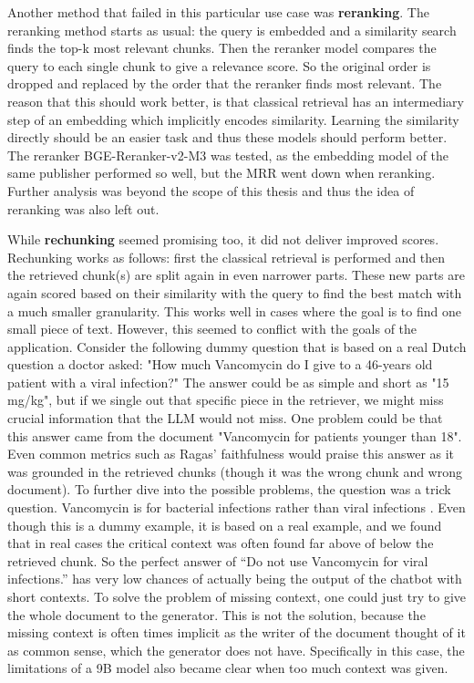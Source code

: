 Another method that failed in this particular use case was \textbf{reranking}. The reranking method starts as usual: the query is embedded and a similarity search finds the top-k most relevant chunks. Then the reranker model compares the query to each single chunk to give a relevance score. So the original order is dropped and replaced by the order that the reranker finds most relevant. The reason that this should work better, is that classical retrieval has an intermediary step of an embedding which implicitly encodes similarity. Learning the similarity directly should be an easier task and thus these models should perform better. The reranker BGE-Reranker-v2-M3 \cite{chen2024bge} was tested, as the embedding model of the same publisher performed so well, but the MRR went down when reranking. Further analysis was beyond the scope of this thesis and thus the idea of reranking was also left out.

While \textbf{rechunking} seemed promising too, it did not deliver improved scores. Rechunking works as follows: first the classical retrieval is performed and then the retrieved chunk(s) are split again in even narrower parts. These new parts are again scored based on their similarity with the query to find the best match with a much smaller granularity. This works well in cases where the goal is to find one small piece of text. However, this seemed to conflict with the goals of the application. Consider the following dummy question that is based on a real Dutch question a doctor asked: "How much Vancomycin do I give to a 46-years old patient with a viral infection?" The answer could be as simple and short as "15 mg/kg", but if we single out that specific piece in the retriever, we might miss crucial information that the LLM would not miss. One problem could be that this answer came from the document "Vancomycin for patients younger than 18". Even common metrics such as Ragas' \cite{es2024ragas} faithfulness would praise this answer as it was grounded in the retrieved chunks (though it was the wrong chunk and wrong document). To further dive into the possible problems, the question was a trick question. Vancomycin is for bacterial infections rather than viral infections \cite{vancomycin_wikipedia}. Even though this is a dummy example, it is based on a real example, and we found that in real cases the critical context was often found far above of below the retrieved chunk. So the perfect answer of ``Do not use Vancomycin for viral infections.'' has very low chances of actually being the output of the chatbot with short contexts. To solve the problem of missing context, one could just try to give the whole document to the generator. This is not the solution, because the missing context is often times implicit as the writer of the document thought of it as common sense, which the generator does not have. Specifically in this case, the limitations of a 9B model also became clear when too much context was given.

